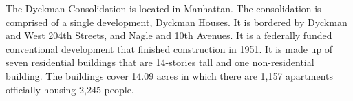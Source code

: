 The Dyckman Consolidation is located in Manhattan. The consolidation is comprised of a single development, Dyckman Houses. It is bordered by Dyckman and West 204th Streets, and Nagle and 10th Avenues. It is a federally funded conventional development that finished construction in 1951. It is made up of seven residential buildings that are 14-stories tall and one non-residential building. The buildings cover 14.09 acres in which there are 1,157 apartments officially housing 2,245 people.